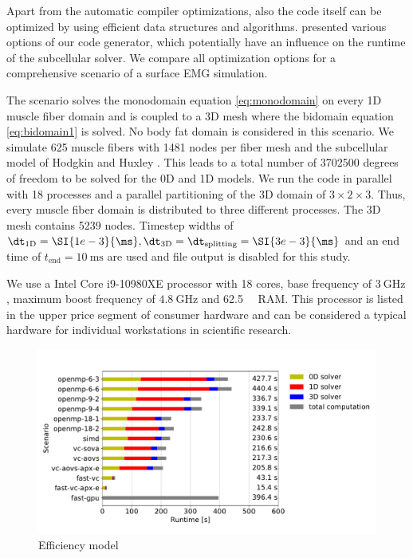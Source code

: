 Apart from the automatic compiler optimizations, also the code itself can be optimized by using efficient data structures and algorithms.  presented various options of our code generator, which potentially have an influence on the runtime of the subcellular solver. 
We compare all optimization options for a comprehensive scenario of a surface EMG simulation. 

The scenario solves the monodomain equation \cref{eq:monodomain} on every 1D muscle fiber domain and is coupled to a 3D mesh where the bidomain equation \cref{eq:bidomain1} is solved. No body fat domain is considered in this scenario.
We simulate 625 muscle fibers with 1481 nodes per fiber mesh and the subcellular model of Hodgkin and Huxley \cite{Hodgkin1952}. This leads to a total number of \num{3702500} degrees of freedom to be solved for the 0D and 1D models.
We run the code in parallel with 18 processes and a parallel partitioning of the 3D domain of $3 \times 2 \times 3$. Thus, every muscle fiber domain is distributed to three different processes.
The 3D mesh contains 5239 nodes. Timestep widths of $\dt_\text{1D} = \SI{1e-3}{\ms}, \dt_\text{3D} = \dt_\text{splitting} = \SI{3e-3}{\ms}$ and an end time of $t_\text{end} = \SI{10}{\ms}$ are used and file output is disabled for this study.

We use a Intel Core i9-10980XE processor with 18 cores, base frequency of $\SI{3}{\giga\hertz}$, maximum boost frequency of $\SI{4.8}{\giga\hertz}$ and \SI{62.5}{\giga\byte} RAM. This processor is listed in the upper price segment of consumer hardware and can be considered a typical hardware for individual workstations in scientific research.

\begin{figure}
  \centering%
  \includegraphics[width=\textwidth]{images/results/studies/fibers_emg_study.pdf}%
  \caption{Efficiency model}%
  \label{fig:fibers_emg_study}%
\end{figure}%

